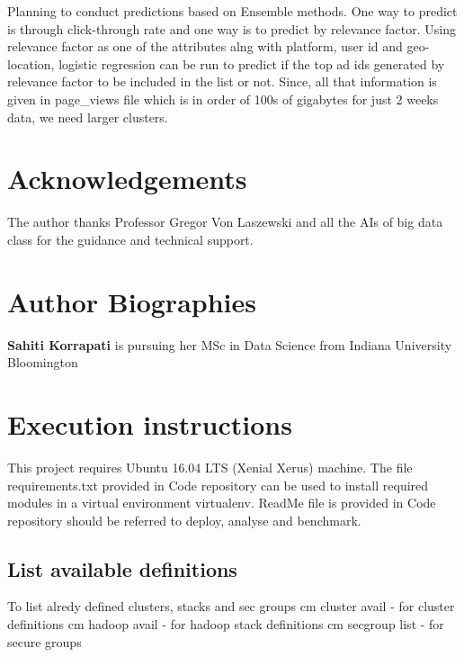 \documentclass[9pt,twocolumn,twoside]{../../styles/osajnl}
\begin{document}
Planning to conduct predictions based on Ensemble methods. One way to predict is through click-through rate and one way is to predict by relevance factor. Using relevance factor as one of the attributes alng with platform, user id and geo-location, logistic regression can be run to predict if the top ad ids generated by relevance factor to be included in the list or not. Since, all that information is given in page\_views file which is in order of 100s of gigabytes for just 2 weeks data, we need larger clusters. 

\section*{Acknowledgements}
The author thanks Professor Gregor Von Laszewski and all the AIs of big data class for the guidance and technical support.


 
\section*{Author Biographies}
\begingroup
\setlength\intextsep{0pt}
\begin{minipage}[t][3.2cm][t]{1.0\columnwidth} %
  \noindent
  {\bfseries Sahiti Korrapati} is pursuing her MSc in Data Science from
  Indiana University Bloomington
\end{minipage}
\endgroup
\newpage
\appendix
\section{Execution instructions}
This project requires Ubuntu 16.04 LTS (Xenial Xerus) machine. The file requirements.txt provided in Code repository can be used to install required modules in a virtual environment virtualenv. ReadMe file is provided in Code repository should be referred to deploy, analyse and benchmark.
\subsection{List available definitions} To list alredy defined clusters, stacks and sec groups
\newline cm cluster avail - for cluster definitions
\newline cm hadoop avail - for hadoop stack definitions
\newline cm secgroup list - for secure groups
\end{document}
